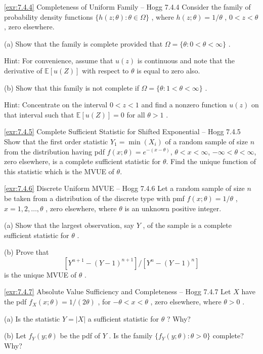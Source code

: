 \begin{exercise}{\ref{exr:7.4.4} Completeness of Uniform Family – Hogg 7.4.4}\label{exr:7.4.4}
Consider the family of probability density functions $\{h(z;\theta):\theta \in \Omega \}$ , where $h(z;\theta) = 1 / \theta$ , $0 < z < \theta$ , zero elsewhere.

(a) Show that the family is complete provided that $\Omega = \{\theta : 0 < \theta < \infty\}$ .

Hint: For convenience, assume that $u(z)$ is continuous and note that the derivative of $\mathbb{E}[u(Z)]$ with respect to $\theta$ is equal to zero also.

(b) Show that this family is not complete if $\Omega = \{\theta : 1 < \theta < \infty\}$ .

Hint: Concentrate on the interval $0 < z < 1$ and find a nonzero function $u(z)$ on that interval such that $\mathbb{E}[u(Z)] = 0$ for all $\theta > 1$ .
\end{exercise}

\begin{exercise}{\ref{exr:7.4.5} Complete Sufficient Statistic for Shifted Exponential – Hogg 7.4.5}\label{exr:7.4.5}
Show that the first order statistic $Y_{1} = \min(X_{i})$ of a random sample of size $n$ from the distribution having pdf $f(x; \theta) = e^{-(x-\theta)}$, $\theta < x < \infty$, $-\infty < \theta < \infty$, zero elsewhere, is a complete sufficient statistic for $\theta$. Find the unique function of this statistic which is the MVUE of $\theta$.
\end{exercise}

\begin{exercise}{\ref{exr:7.4.6} Discrete Uniform MVUE – Hogg 7.4.6}\label{exr:7.4.6}
Let a random sample of size $n$ be taken from a distribution of the discrete type with pmf $f(x; \theta) = 1 / \theta$ , $x = 1, 2, \ldots, \theta$ , zero elsewhere, where $\theta$ is an unknown positive integer.

(a) Show that the largest observation, say $Y$ , of the sample is a complete sufficient statistic for $\theta$ .

(b) Prove that
\[
[Y^{n+1} - (Y - 1)^{n+1}] / [Y^{n} - (Y - 1)^{n}]
\]
is the unique MVUE of $\theta$ .
\end{exercise}

\begin{exercise}{\ref{exr:7.4.7} Absolute Value Sufficiency and Completeness – Hogg 7.4.7}\label{exr:7.4.7}
Let $X$ have the pdf $f_{X}(x;\theta) = 1 / (2\theta)$ , for $-\theta < x < \theta$ , zero elsewhere, where $\theta > 0$ .

(a) Is the statistic $Y = |X|$ a sufficient statistic for $\theta$ ? Why?

(b) Let $f_{Y}(y;\theta)$ be the pdf of $Y$ . Is the family $\{f_{Y}(y;\theta):\theta >0\}$ complete? Why?
\end{exercise}

